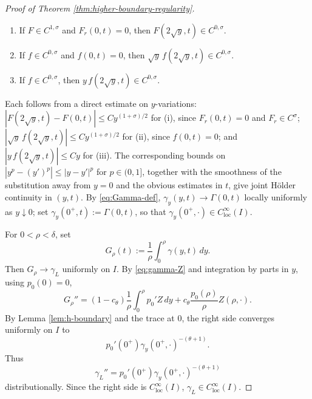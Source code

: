 \documentclass[11pt]{amsart}
\newcommand{\dd}{\,d}
\newcommand{\loc}{\mathrm{loc}}
\begin{document}
\begin{proof}[Proof of Theorem \ref{thm:higher-boundary-regularity}]
\begin{enumerate}
\item[(i)] If \(F\in C^{1,\sigma}\) and \(F_r(0,t)=0\), then
\(F(2\sqrt y,t)\in C^{0,\sigma}\).
\item[(ii)] If \(f\in C^{0,\sigma}\) and \(f(0,t)=0\), then
\(\sqrt y\,f(2\sqrt y,t)\in C^{0,\sigma}\).
\item[(iii)] If \(f\in C^{0,\sigma}\), then
\(y\,f(2\sqrt y,t)\in C^{0,\sigma}\).
\end{enumerate}
Each follows from a direct estimate on \(y\)-variations:
\(|F(2\sqrt y,t)-F(0,t)|\le Cy^{(1+\sigma)/2}\) for (i), since
\(F_r(0,t)=0\) and \(F_r\in C^\sigma\); \(|\sqrt y\,f(2\sqrt y,t)|\le
Cy^{(1+\sigma)/2}\) for (ii), since \(f(0,t)=0\); and \(|y\,f(2\sqrt
y,t)|\le Cy\) for (iii). The corresponding bounds on
\(|y^p-(y')^p|\le|y-y'|^p\) for \(p\in(0,1]\), together with the smoothness
of the substitution away from \(y=0\) and the obvious estimates in \(t\),
give joint H\"older continuity in \((y,t)\).
By \eqref{eq:Gamma-def}, \(\gamma_y(y,t)\to\Gamma(0,t)\) locally
uniformly as \(y\downarrow 0\); set \(\gamma_y(0^+,t):=\Gamma(0,t)\), so that
\(\gamma_y(0^+,\cdot)\in C^\infty_{\loc}(I)\).

For \(0<\rho<\delta\), set
\[
        G_\rho(t):=\frac1\rho\int_0^\rho\gamma(y,t)\dd y .
\]
Then \(G_\rho\to\gamma_L\) uniformly on \(I\). By \eqref{eq:gamma-Z}
and integration by parts in \(y\), using \(p_0(0)=0\),
\[
        G_\rho''
        =
        (1-c_\theta)\frac1\rho\int_0^\rho p_0'Z\dd y
        +c_\theta\frac{p_0(\rho)}{\rho}Z(\rho,\cdot).
\]
By Lemma \ref{lem:h-boundary} and the trace at \(0\), the right side converges
uniformly on \(I\) to
\[
        p_0'(0^+)\gamma_y(0^+,\cdot)^{-(\theta+1)} .
\]
Thus
\begin{equation}
\label{eq:left-acceleration}
        \gamma_L''=p_0'(0^+)\gamma_y(0^+,\cdot)^{-(\theta+1)}
\end{equation}
distributionally. Since the right side is \(C^\infty_{\loc}(I)\),
\(\gamma_L\in C^\infty_{\loc}(I)\).


\end{proof}
\end{document}
